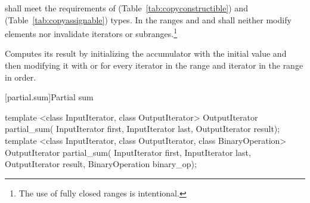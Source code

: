 \documentclass[ebook,11pt,article]{memoir}
\begin{document}
\begin{itemdescr}
\pnum
\requires
{} shall meet the requirements of  (Table~\ref{tab:copyconstructible})
and  (Table~\ref{tab:copyassignable}) types.
In the ranges
and
and
shall neither modify elements nor invalidate iterators or subranges.\footnote{The use of fully closed ranges is intentional.}

\pnum
\effects
Computes its result by initializing the accumulator
with the initial value
and then modifying it with
\added{\tcode{)}}
or
\added{\tcode{)}}
for every iterator
in the range 
and iterator
in the range
in order.
\end{itemdescr}

[partial.sum]{Partial sum}

%
\begin{itemdecl}
template <class InputIterator, class OutputIterator>
  OutputIterator partial_sum(
    InputIterator first, InputIterator last,
    OutputIterator result);
template <class InputIterator, class OutputIterator, class BinaryOperation>
  OutputIterator partial_sum(
    InputIterator first, InputIterator last,
    OutputIterator result, BinaryOperation binary_op);
\end{itemdecl}
\end{document}

